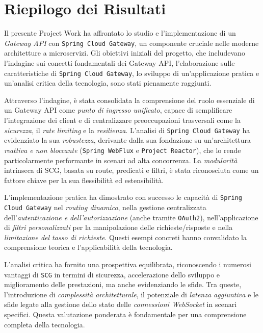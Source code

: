 \section{Riepilogo dei Risultati}

Il presente Project Work ha affrontato lo studio e l'implementazione di un \emph{Gateway API} con \texttt{Spring Cloud Gateway}, un componente cruciale nelle moderne architetture a microservizi. Gli obiettivi iniziali del progetto, che includevano l'indagine sui concetti fondamentali dei Gateway API, l'elaborazione sulle caratteristiche di \texttt{Spring Cloud Gateway}, lo sviluppo di un'applicazione pratica e un'analisi critica della tecnologia, sono stati pienamente raggiunti.

Attraverso l'indagine, è stata consolidata la comprensione del ruolo essenziale di un Gateway API come \emph{punto di ingresso unificato}, capace di semplificare l'integrazione dei client e di centralizzare preoccupazioni trasversali come la \emph{sicurezza}, il \emph{rate limiting} e la \emph{resilienza}. L'analisi di \texttt{Spring Cloud Gateway} ha evidenziato la sua \emph{robustezza}, derivante dalla sua fondazione su un'architettura \emph{reattiva e non bloccante} (\texttt{Spring WebFlux} e \texttt{Project Reactor}), che lo rende particolarmente performante in scenari ad alta concorrenza. La \emph{modularità} intrinseca di \textsc{SCG}, basata su route, predicati e filtri, è stata riconosciuta come un fattore chiave per la sua flessibilità ed estensibilità.

L'implementazione pratica ha dimostrato con successo le capacità di \texttt{Spring Cloud Gateway} nel \emph{routing dinamico}, nella gestione centralizzata dell'\emph{autenticazione e dell'autorizzazione} (anche tramite \texttt{OAuth2}), nell'applicazione di \emph{filtri personalizzati} per la manipolazione delle richieste/risposte e nella \emph{limitazione del tasso di richieste}. Questi esempi concreti hanno convalidato la comprensione teorica e l'applicabilità della tecnologia.

L'analisi critica ha fornito una prospettiva equilibrata, riconoscendo i numerosi vantaggi di \texttt{SCG} in termini di sicurezza, accelerazione dello sviluppo e miglioramento delle prestazioni, ma anche evidenziando le sfide. Tra queste, l'introduzione di \emph{complessità architetturale}, il potenziale di \emph{latenza aggiuntiva} e le sfide legate alla gestione dello stato delle \emph{connessioni WebSocket} in scenari specifici. Questa valutazione ponderata è fondamentale per una comprensione completa della tecnologia.

